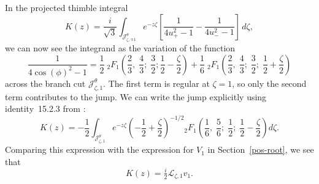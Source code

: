 \documentclass{article}
\newcommand{\laplace}{\mathcal{L}}
\theoremstyle{definition}
\theoremstyle{plain}
\newenvironment{revised}{\color{DarkBlue}}{\color{black}}
\begin{document}
\begin{revised}
In the projected thimble integral
\[ K(z) = \frac{i}{\sqrt{3}} \int_{\mathcal{J}^\theta_{\zeta, \mp 1}} e^{-z\zeta}\left[\frac{1}{4u_+^2 - 1} - \frac{1}{4u_-^2 - 1}\right]\,d\zeta, \]
we can now see the integrand as the variation of the function
\[ \frac{1}{4\cos(\phi)^2 - 1} = \frac{1}{2}\;{}_2F_1\left(\frac{2}{3},\;\frac{4}{3};\;\frac{3}{2};\frac{1}{2} - \frac{\zeta}{2}\right) + \frac{1}{6}\;{}_2F_1\left(\frac{2}{3},\;\frac{4}{3};\;\frac{3}{2};\;\frac{1}{2} + \frac{\zeta}{2}\right) \]
across the branch cut $\mathcal{J}^\theta_{\zeta,1}$. The first term is regular at $\zeta = 1$, so only the second term contributes to the jump. We can write the jump explicitly using identity~15.2.3 from \cite{dlmf}:
\[ K(z) = -\frac{1}{2} \int_{\mathcal{J}^\theta_{\zeta, 1}} e^{-z\zeta} \left(-\frac{1}{2}+\frac{\zeta}{2}\right)^{-1/2} {}_2F_1\left(\frac{1}{6},\;\frac{5}{6};\;\frac{1}{2};\;\frac{1}{2} - \frac{\zeta}{2}\right) d\zeta. \]
Comparing this expression with the expression for $V_1$ in Section~\ref{pos-root}, we see that
\[ K(z) = \tfrac{i}{2}\laplace_{\zeta, 1} v_1. \]
\end{revised}
\end{document}
